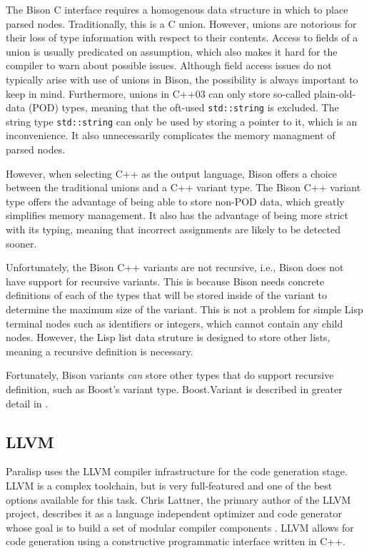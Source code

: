 \documentclass[
abstracton,
fontsize=12pt,
]{scrartcl}
\begin{document}
The Bison C interface requires a homogenous data structure in which to place parsed nodes. Traditionally, this is a C union. However, unions are notorious for their loss of type information with respect to their contents. Access to fields of a union is usually predicated on assumption, which also makes it hard for the compiler to warn about possible issues. Although field access issues do not typically arise with use of unions in Bison, the possibility is always important to keep in mind. Furthermore, unions in C++03 can only store so-called plain-old-data (POD) types, meaning that the oft-used \verb|std::string| is excluded. The string type \verb|std::string| can only be used by storing a pointer to it, which is an inconvenience. It also unnecessarily complicates the memory managment of parsed nodes.

However, when selecting C++ as the output language, Bison offers a choice between the traditional unions and a C++ variant type. The Bison C++ variant type offers the advantage of being able to store non-POD data, which greatly simplifies memory management. It also has the advantage of being more strict with its typing, meaning that incorrect assignments are likely to be detected sooner.

Unfortunately, the Bison C++ variants are not recursive, i.e., Bison does not have support for recursive variants. This is because Bison needs concrete definitions of each of the types that will be stored inside of the variant to determine the maximum size of the variant. This is not a problem for simple Lisp terminal nodes such as identifiers or integers, which cannot contain any child nodes. However, the Lisp list data struture is designed to store other lists, meaning a recursive definition is necessary.

Fortunately, Bison variants \emph{can} store other types that do support recursive definition, such as Boost's variant type. Boost.Variant is described in greater detail in .

\subsection{LLVM}

Paralisp uses the LLVM compiler infrastructure for the code generation stage. LLVM is a complex toolchain, but is very full-featured and one of the best options available for this task. Chris Lattner, the primary author of the LLVM project, describes it as a language independent optimizer and code generator whose goal is to build a set of modular compiler components \autocite{2011-02-FOSDEM-LLVMAndClang}. LLVM allows for code generation using a constructive programmatic interface written in C++.
\end{document}
